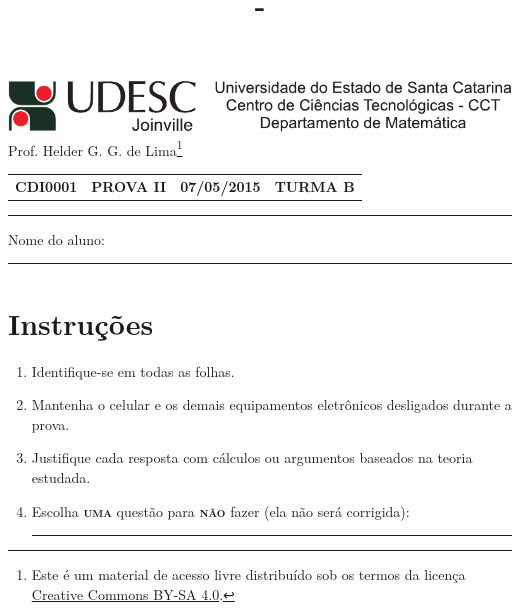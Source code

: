 \documentclass[12pt,a4paper]{article}
\author{\eu}
\title{\tipo - \disciplina}
\date{\data}
\newcommand*\tipo{PROVA II}
\newcommand*\turma{TURMA B}
\newcommand*\disciplina{CDI0001}
\newcommand*\eu{Helder G. G. de Lima}
\newcommand*\data{07/05/2015}
\begin{document}
\thispagestyle{empty}
\begin{center}
\includegraphics{udesc_joinville_cabecalho.pdf}
\\ Prof. \eu\footnote{
Este é um material de acesso livre distribuído sob os termos da licença \href{https://creativecommons.org/licenses/by-sa/4.0/deed.pt_BR}{Creative Commons BY-SA 4.0}.}

\noindent\begin{tabular}{l c c r}
  \textbf{\disciplina}
& \textbf{\tipo}
& \textbf{\data}
& \textbf{\turma}
\end{tabular}\vspace{-0.3cm}
\noindent\rule{17cm}{0.01cm}
\end{center}

\noindent Nome do aluno: \rule{14cm}{0.01cm}

\section*{Instruções}

\begin{enumerate}
\renewcommand{\theenumi}{\Roman{enumi}}
\item Identifique-se em todas as folhas.
\item Mantenha o celular e os demais equipamentos eletrônicos desligados durante a prova.
\item Justifique cada resposta com cálculos ou argumentos baseados na teoria estudada.
\item Escolha \textsc{\textbf{uma}} questão para \textsc{\textbf{não}} fazer (ela não será corrigida): \rule{3cm}{0.01cm}
\end{enumerate}
\end{document}
